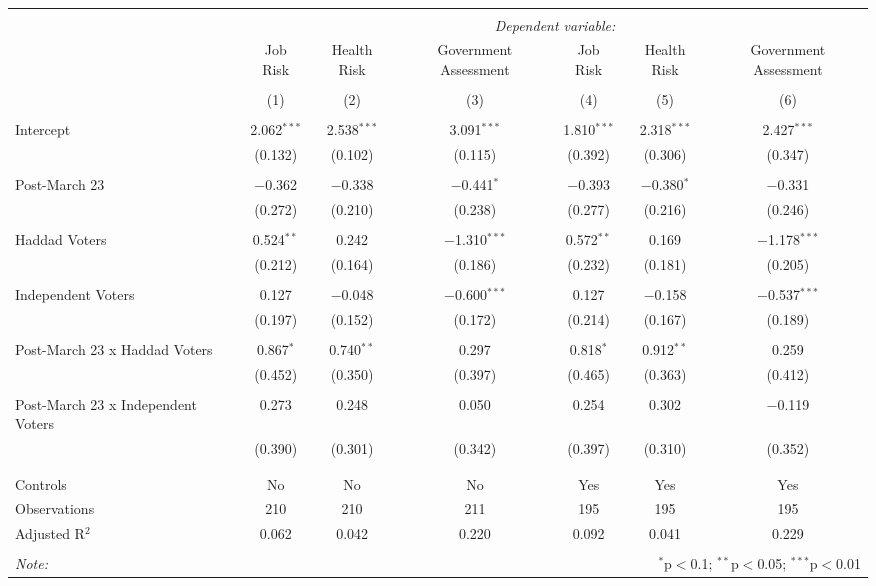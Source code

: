
\begin{table}[!htbp] \centering 
  \caption{} 
  \label{} 
\begin{tabular}{@{\extracolsep{5pt}}lcccccc} 
\\[-1.8ex]\hline 
\hline \\[-1.8ex] 
 & \multicolumn{6}{c}{\textit{Dependent variable:}} \\ 
\cline{2-7} 
 & Job Risk & Health Risk & Government Assessment & Job Risk & Health Risk & Government Assessment \\ 
\\[-1.8ex] & (1) & (2) & (3) & (4) & (5) & (6)\\ 
\hline \\[-1.8ex] 
 Intercept & 2.062$^{***}$ & 2.538$^{***}$ & 3.091$^{***}$ & 1.810$^{***}$ & 2.318$^{***}$ & 2.427$^{***}$ \\ 
  & (0.132) & (0.102) & (0.115) & (0.392) & (0.306) & (0.347) \\ 
  & & & & & & \\ 
 Post-March 23 & $-$0.362 & $-$0.338 & $-$0.441$^{*}$ & $-$0.393 & $-$0.380$^{*}$ & $-$0.331 \\ 
  & (0.272) & (0.210) & (0.238) & (0.277) & (0.216) & (0.246) \\ 
  & & & & & & \\ 
 Haddad Voters & 0.524$^{**}$ & 0.242 & $-$1.310$^{***}$ & 0.572$^{**}$ & 0.169 & $-$1.178$^{***}$ \\ 
  & (0.212) & (0.164) & (0.186) & (0.232) & (0.181) & (0.205) \\ 
  & & & & & & \\ 
 Independent Voters & 0.127 & $-$0.048 & $-$0.600$^{***}$ & 0.127 & $-$0.158 & $-$0.537$^{***}$ \\ 
  & (0.197) & (0.152) & (0.172) & (0.214) & (0.167) & (0.189) \\ 
  & & & & & & \\ 
 Post-March 23 x Haddad Voters & 0.867$^{*}$ & 0.740$^{**}$ & 0.297 & 0.818$^{*}$ & 0.912$^{**}$ & 0.259 \\ 
  & (0.452) & (0.350) & (0.397) & (0.465) & (0.363) & (0.412) \\ 
  & & & & & & \\ 
 Post-March 23 x Independent Voters & 0.273 & 0.248 & 0.050 & 0.254 & 0.302 & $-$0.119 \\ 
  & (0.390) & (0.301) & (0.342) & (0.397) & (0.310) & (0.352) \\ 
  & & & & & & \\ 
\hline \\[-1.8ex] 
Controls & No & No & No & Yes & Yes & Yes \\ 
Observations & 210 & 210 & 211 & 195 & 195 & 195 \\ 
Adjusted R$^{2}$ & 0.062 & 0.042 & 0.220 & 0.092 & 0.041 & 0.229 \\ 
\hline 
\hline \\[-1.8ex] 
\textit{Note:}  & \multicolumn{6}{r}{$^{*}$p$<$0.1; $^{**}$p$<$0.05; $^{***}$p$<$0.01} \\ 
\end{tabular} 
\end{table} 
